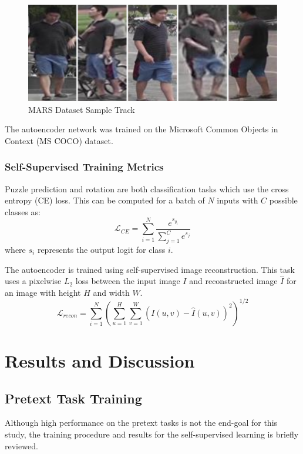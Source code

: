 \documentclass[10pt,twocolumn,letterpaper]{article}
\begin{document}
\begin{figure}
    \centering
    \includegraphics[width=0.95\linewidth]{docs/reports/figs/mars_example.png}
    \caption{MARS Dataset Sample Track}
    \label{fig:mars}
\end{figure}

The autoencoder network was trained on the Microsoft Common Objects in Context (MS COCO) dataset. 

\subsubsection{Self-Supervised Training Metrics}
Puzzle prediction and rotation are both classification tasks which use the cross entropy (CE) loss. This can be computed for a batch of $N$ inputs with $C$ possible classes as:
\begin{equation}
    \mathcal{L}_{CE} = \sum_{i=1}^{N}\dfrac{e^{s_{y_i}}}{\sum_{j=1}^{C} e^{s_j}}
\end{equation}
where $s_i$ represents the output logit for class $i$.

The autoencoder is trained using self-supervised image reconstruction. This task uses a pixelwise $L_2$ loss between the input image $I$ and reconstructed image $\hat{I}$ for an image with height $H$ and width $W$.
\begin{equation}
    \mathcal{L}_{recon} = \sum_{i=1}^{N} \left(\sum_{u=1}^{H} \sum_{v=1}^{W} (I(u,v) - \hat{I}(u,v))^2\right)^{1/2}
\end{equation}
\section{Results and Discussion}
\subsection{Pretext Task Training}
Although high performance on the pretext tasks is not the end-goal for this study, the training procedure and results for the self-supervised learning is briefly reviewed.
\end{document}
